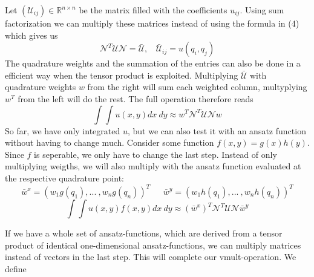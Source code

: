 Let $(\mathcal{U}_{ij}) \in \mathbb{R}^{n \times n}$ be the matrix filled with the coefficients $u_{ij}$. Using sum factorization we can multiply these matrices instead of using the formula in (4) which gives us
\begin{equation}
\mathcal{N}^T \mathcal{U} \mathcal{N} = \bar{\mathcal{U}}, \ \ \ \ \bar{\mathcal{U}}_{ij} = u(q_i,q_j)
\end{equation}
The quadrature weights and the summation of the entries can also be done in a efficient way when the tensor product is exploited. Multiplying $\bar{\mathcal{U}}$ with quadrature weights $w$ from the right will sum each weighted column, multyplying $w^T$ from the left will do the rest. The full operation therefore reads
\begin{equation}
\int \int u(x,y) dx \ dy \approx w^T \mathcal{N}^T \mathcal{U} \mathcal{N} w
\end{equation} 
So far, we have only integrated $u$, but we can also test it with an ansatz function without having to change much. Consider some function $f(x,y)=g(x)h(y)$. Since $f$ is seperable, we only have to change the last step. Instead of only multiplying weigths, we will also multiply with the ansatz function evaluated at the respective quadrature point: 
\[\bar{w}^x=(w_1 g(q_1), ... \ ,w_n g(q_n))^T \ \ \ \ \ \ \ \bar{w}^y=(w_1 h(q_1), ... \ ,w_n h(q_n))^T\]
\begin{equation}
\int \int u(x,y) f(x,y) dx \ dy \approx (\bar{w}^x)^T \mathcal{N}^T \mathcal{U} \mathcal{N} \bar{w}^y
\end{equation}

If we have a whole set of ansatz-functions, which are derived from a tensor product of identical one-dimensional ansatz-functions, we can multiply matrices instead of vectors in the last step. This will complete our vmult-operation. We define


